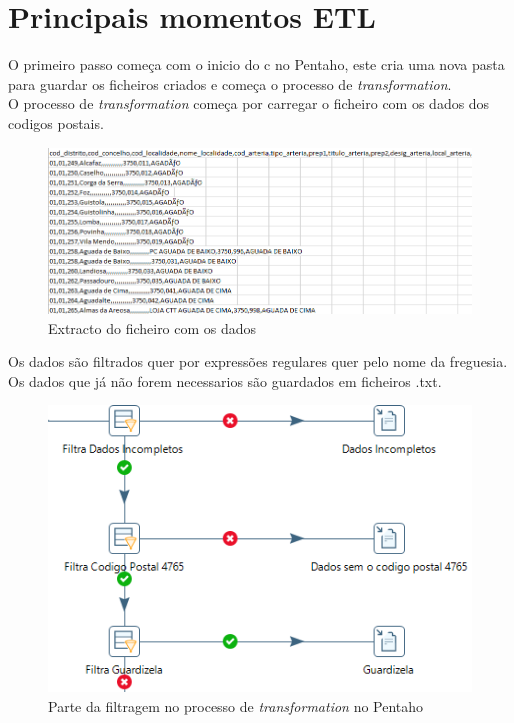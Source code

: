 \documentclass[11pt]{report}
\begin{document}
\clearpage


\chapter*{Principais momentos ETL}

O primeiro passo começa com o inicio do c no Pentaho, este cria uma nova pasta para guardar os ficheiros criados e começa o processo de \textit{transformation}.\\
O processo de \textit{transformation} começa por carregar o ficheiro com os dados dos codigos postais.


\begin{figure} [!h]
\centering
\includegraphics[width=\textwidth]{Prints_Trabalho/excel}
\caption{Extracto do ficheiro com os dados}
\label{excel}
\end{figure}


\clearpage

Os dados são filtrados quer por expressões regulares quer pelo nome da freguesia. Os dados que já não forem necessarios são guardados em ficheiros .txt.

\begin{figure} [!h]
\centering
\includegraphics[width=\textwidth]{Prints_Trabalho/filtra}
\caption{Parte da filtragem no processo de \textit{transformation} no Pentaho}
\label{filtragem}
\end{figure}
\end{document}
